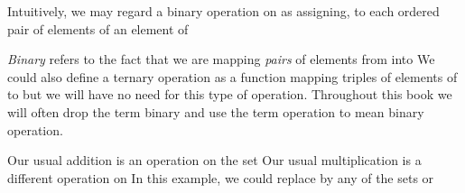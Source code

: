 \documentclass[11pt,oneside]{article}
\begin{document}
\begin{BookBody}
Intuitively, we may regard a binary operation \BookInline{\ast } on  as assigning, to each ordered pair  of elements of  an element  of 

\textit{Binary} refers to the fact that we are mapping\textit{ pairs} of elements from  into  We could also define a ternary operation as a function mapping triples of elements of  to  but we will have no need for this type of operation. Throughout this book we will often drop the term binary and use the term operation to mean binary operation.

 Our usual addition \BookInline{+ } is an operation on the set  Our usual multiplication \BookInline{\cdot } is a different operation on  In this example, we could replace  by any of the sets   or \BookEnd{\blacktriangle}

\end{BookBody}

\BookNarrativetrue
\end{document}
